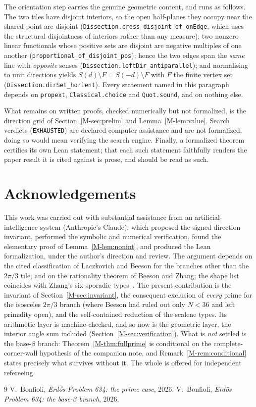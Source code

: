 \documentclass[11pt,reqno]{amsart}
\theoremstyle{plain}
\theoremstyle{definition}
\begin{document}
The orientation step carries the genuine geometric content, and runs as follows. The two tiles have
disjoint interiors, so the open half-planes they occupy near the shared point are disjoint
(\texttt{Dissection.cross\_disjoint\_of\_onEdge}, which uses the structural disjointness of interiors
rather than any measure); two nonzero linear functionals whose positive sets are disjoint are negative
multiples of one another (\texttt{proportional\_of\_disjoint\_pos}); hence the two edges span the
\emph{same} line with \emph{opposite} senses (\texttt{Dissection.leftDir\_antiparallel}); and
normalising to unit directions yields $S(d)\setminus F=S(-d)\setminus F$ with $F$ the finite vertex set
(\texttt{Dissection.dirSet\_horient}). Every statement named in this paragraph depends on
\texttt{propext}, \texttt{Classical.choice} and \texttt{Quot.sound}, and on nothing else.

What remains on written proofs, checked numerically but not formalized, is the direction grid of
Section~\ref{M-sec:prelim} and Lemma~\ref{M-lem:value}. Search verdicts (\texttt{EXHAUSTED}) are
declared computer assistance and are not formalized: doing so would mean verifying the search
engine. Finally, a formalized theorem certifies its own Lean statement; that each such statement
faithfully renders the paper result it is cited against is prose, and should be read as such.

\section*{Acknowledgements}

This work was carried out with substantial assistance from an artificial-intelligence system
(Anthropic's Claude), which proposed the signed-direction invariant, performed the symbolic and
numerical verification, found the elementary proof of Lemma~\ref{M-lem:nonint}, and produced the Lean
formalization, under the author's direction and review. The argument depends on the cited
classification of Laczkovich and Beeson for the branches other than the $2\pi/3$ tile, and on the
rationality theorem of Beeson and Zhang; the shape list coincides with Zhang's six sporadic
types~\cite{Zhang}. The present contribution is the invariant of Section~\ref{M-sec:invariant}, the
consequent exclusion of \emph{every} prime for the isosceles $2\pi/3$ branch (where Beeson had ruled
out only $N<36$ and left primality open), and the self-contained reduction of the scalene types. Its
arithmetic layer is machine-checked, and so now is the geometric layer, the interior angle sum
included (Section~\ref{M-sec:verification}). What is \emph{not} settled is the base-$\beta$ branch:
Theorem~\ref{M-thm:fullprime} is conditional on the complete-corner-wall hypothesis of the companion
note, and Remark~\ref{M-rem:conditional} states precisely what survives without it. The whole is
offered for independent refereeing.

\begin{thebibliography}{9}
 V.~Bonfioli, \emph{Erd\H{o}s Problem 634: the prime case}, 2026.
 V.~Bonfioli, \emph{Erd\H{o}s Problem 634: the base-$\beta$ branch}, 2026.
\end{thebibliography}
\end{document}
